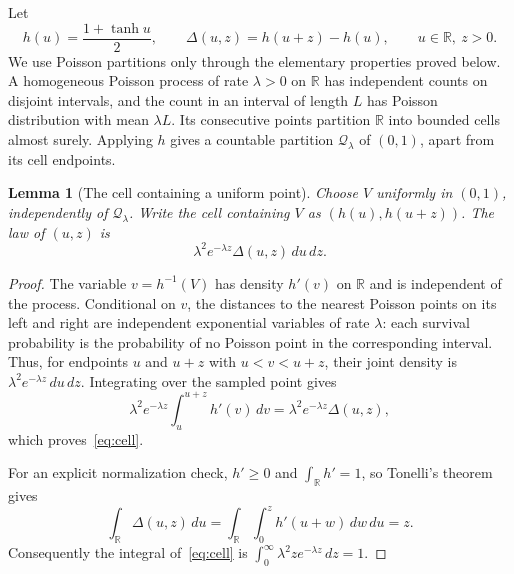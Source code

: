 \documentclass[11pt]{article}
\newtheorem{lemma}[theorem]{Lemma}
\theoremstyle{remark}
\newcommand{\R}{\mathbb R}
\newcommand{\dd}{\,d}
\begin{document}
Let
\begin{equation}\label{eq:logistic}
 h(u)=\frac{1+\tanh u}{2},\qquad
 \Delta(u,z)=h(u+z)-h(u),\qquad u\in\R,\ z>0.
\end{equation}
We use Poisson partitions only through the elementary properties proved
below. A homogeneous Poisson process of rate $\lambda>0$ on $\R$ has
independent counts on disjoint intervals, and the count in an interval
of length $L$ has Poisson distribution with mean $\lambda L$.
Its consecutive points partition $\R$ into bounded cells almost surely.
Applying $h$ gives a countable partition $\mathcal Q_\lambda$ of $(0,1)$,
apart from its cell endpoints.

\begin{lemma}[The cell containing a uniform point]\label{lem:cell}
Choose $V$ uniformly in $(0,1)$, independently of $\mathcal Q_\lambda$.
Write the cell containing $V$ as $(h(u),h(u+z))$. The law of $(u,z)$ is
\begin{equation}\label{eq:cell}
 \lambda^2 e^{-\lambda z}\Delta(u,z)\dd u\dd z.
\end{equation}
\end{lemma}

\begin{proof}
The variable $v=h^{-1}(V)$ has density $h'(v)$ on $\R$ and is independent
of the process. Conditional on $v$, the distances to the nearest Poisson
points on its left and right are independent exponential variables of
rate $\lambda$: each survival probability is the probability of no
Poisson point in the corresponding interval. Thus, for endpoints $u$
and $u+z$ with $u<v<u+z$, their joint density is
$\lambda^2e^{-\lambda z}\dd u\dd z$.
Integrating over the sampled point gives
\[
 \lambda^2e^{-\lambda z}\int_u^{u+z}h'(v)\dd v
 =\lambda^2e^{-\lambda z}\Delta(u,z),
\]
which proves~\eqref{eq:cell}.

For an explicit normalization check, $h'\geq0$ and $\int_\R h'=1$, so
Tonelli's theorem gives
\begin{equation}\label{eq:gap-integral}
 \int_\R\Delta(u,z)\dd u
 =\int_\R\int_0^z h'(u+w)\dd w\dd u=z.
\end{equation}
Consequently the integral of~\eqref{eq:cell} is
$\int_0^\infty\lambda^2z e^{-\lambda z}\dd z=1$.
\end{proof}
\end{document}
